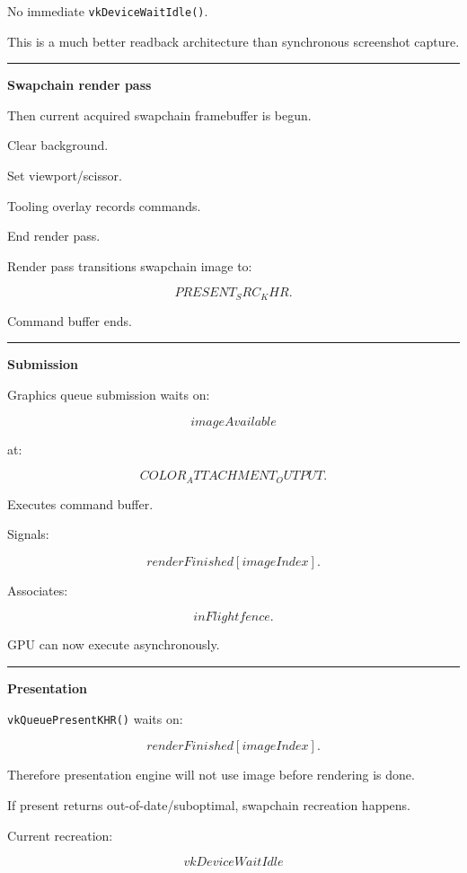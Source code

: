 No immediate \texttt{vkDeviceWaitIdle()}.

This is a much better readback architecture than synchronous screenshot capture.

\begin{center}\rule{0.5\linewidth}{0.5pt}\end{center}

\textbf{Swapchain render pass}

Then current acquired swapchain framebuffer is begun.

Clear background.

Set viewport/scissor.

Tooling overlay records commands.

End render pass.

Render pass transitions swapchain image to:

\[
PRESENT_SRC_KHR.
\]

Command buffer ends.

\begin{center}\rule{0.5\linewidth}{0.5pt}\end{center}

\textbf{Submission}

Graphics queue submission waits on:

\[
imageAvailable
\]

at:

\[
COLOR_ATTACHMENT_OUTPUT.
\]

Executes command buffer.

Signals:

\[
renderFinished[imageIndex].
\]

Associates:

\[
inFlight fence.
\]

GPU can now execute asynchronously.

\begin{center}\rule{0.5\linewidth}{0.5pt}\end{center}

\textbf{Presentation}

\texttt{vkQueuePresentKHR()} waits on:

\[
renderFinished[imageIndex].
\]

Therefore presentation engine will not use image before rendering is done.

If present returns out-of-date/suboptimal, swapchain recreation happens.

Current recreation:

\[
vkDeviceWaitIdle
\]

